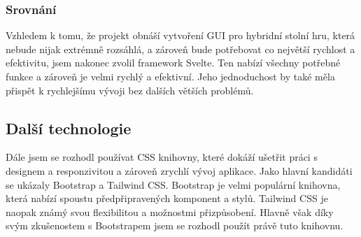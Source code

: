 \subsubsection*{Srovnání}
Vzhledem k tomu, že projekt obnáší vytvoření GUI pro hybridní stolní hru, která nebude nijak extrémně rozsáhlá, a zároveň bude potřebovat co největší rychlost a efektivitu, jsem nakonec zvolil framework Svelte. Ten nabízí všechny potřebné funkce a zároveň je velmi rychlý a efektivní. Jeho jednoduchost by také měla přispět k rychlejšímu vývoji bez dalších větších problémů.

\subsection{Další technologie}
Dále jsem se rozhodl používat CSS knihovny, které dokáží ušetřit práci s designem a responzivitou a zároveň zrychlí vývoj aplikace. Jako hlavní kandidáti se ukázaly Bootstrap a Tailwind CSS. Bootstrap je velmi populární knihovna, která nabízí spoustu předpřipravených komponent a stylů. Tailwind CSS je naopak známý svou flexibilitou a možnostmi přizpůsobení. Hlavně však díky svým zkušenostem s Bootstrapem jsem se rozhodl použít právě tuto knihovnu.